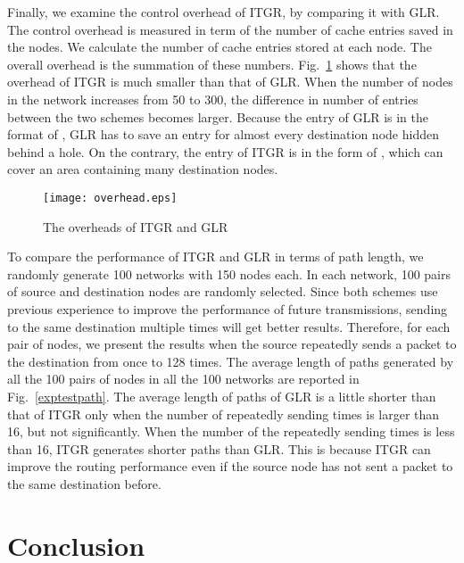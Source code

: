 \documentclass[3p,times]{elsarticle}
\begin{document}
Finally, we examine the control overhead of ITGR, by comparing it with GLR.
The control overhead is measured in term of the number of cache
entries saved in the nodes.
We calculate the number of cache entries stored at each node. The
overall overhead is the summation of these numbers.
Fig.~\ref{overhead}
shows
that the overhead of ITGR is much smaller than that of GLR.
When the number of nodes in the network increases from 50 to 300, the difference
in number of entries between the
two schemes becomes larger.
Because the entry of GLR is in the format of ,
GLR has to save an entry for
almost every destination node hidden behind a hole.
On the contrary, the entry of ITGR is in the form of ,
which can cover an area containing many destination nodes.

\begin{figure}[!htp]
\begin{center}
\texttt{[image: overhead.eps]}
\end{center}
\caption{The overheads of ITGR and GLR}
\label{overhead}
\end{figure}



To compare the performance of ITGR and GLR in terms of path length,
we randomly generate 100 networks with 150 nodes each.
In each network, 100 pairs
of source and destination nodes are randomly selected.
Since both schemes use previous experience to improve the performance of future transmissions,
sending to the same destination multiple times will get better results.
Therefore,
for each pair of nodes,
we present the results when
the source repeatedly sends a packet to the destination from once to 128 times.
The average length of paths generated by all the  100 pairs of nodes in all the 100 networks are reported in Fig.~\ref{exptestpath}.
The average length of paths
of GLR is a little shorter than that of ITGR only when the number of repeatedly sending times is larger
than 16, but not significantly.
When the number of the repeatedly sending times is less than 16, ITGR generates shorter paths than GLR.
This is because ITGR can improve the routing performance even if the source node has not sent a packet
to the same destination before.







\section{Conclusion}
\label{conclusion}
\end{document}
